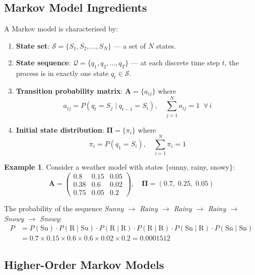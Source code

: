 \documentclass[11pt,a4paper]{article}
\theoremstyle{definition}
\newtheorem{example}{Example}[section]
\theoremstyle{plain}
\theoremstyle{remark}
\begin{document}
\subsection{Markov Model Ingredients}

A Markov model is characterised by:

\begin{enumerate}
    \item \textbf{State set}: $\mathcal{S} = \{S_1, S_2, \dots, S_N\}$ --- a set of $N$ states.
    \item \textbf{State sequence}: $\mathcal{Q} = \{q_1, q_2, \dots, q_T\}$ --- at each discrete time step $t$, the process is in exactly one state $q_t \in \mathcal{S}$.
    \item \textbf{Transition probability matrix}: $\mathbf{A} = \{a_{ij}\}$ where
    \[
    a_{ij} = P(q_t = S_j \mid q_{t-1} = S_i), \quad \sum_{j=1}^{N} a_{ij} = 1 \;\; \forall \, i
    \]
    \item \textbf{Initial state distribution}: $\boldsymbol{\Pi} = \{\pi_i\}$ where
    \[
    \pi_i = P(q_1 = S_i), \quad \sum_{i=1}^{N} \pi_i = 1
    \]
\end{enumerate}

\begin{example}
Consider a weather model with states $\{$sunny, rainy, snowy$\}$:
\[
\mathbf{A} = \begin{pmatrix} 0.8 & 0.15 & 0.05 \\ 0.38 & 0.6 & 0.02 \\ 0.75 & 0.05 & 0.2 \end{pmatrix}, \quad \boldsymbol{\Pi} = (0.7, \; 0.25, \; 0.05)
\]

The probability of the sequence \emph{Sunny $\to$ Rainy $\to$ Rainy $\to$ Rainy $\to$ Snowy $\to$ Snowy}:
\begin{align*}
P &= P(\text{Su}) \cdot P(\text{R}\mid\text{Su}) \cdot P(\text{R}\mid\text{R}) \cdot P(\text{R}\mid\text{R}) \cdot P(\text{Sn}\mid\text{R}) \cdot P(\text{Sn}\mid\text{Sn}) \\
  &= 0.7 \times 0.15 \times 0.6 \times 0.6 \times 0.02 \times 0.2 = 0.0001512
\end{align*}
\end{example}

\subsection{Higher-Order Markov Models}
\end{document}

